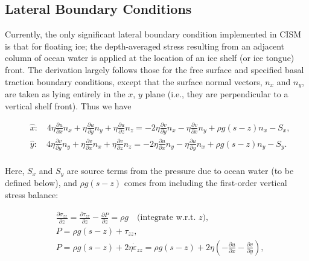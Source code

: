 
\subsection{Lateral Boundary Conditions}
Currently, the only significant lateral boundary condition implemented in CISM 
is that for floating ice; the depth-averaged stress resulting from an adjacent column of ocean water is applied at the location of an ice shelf (or ice tongue) front. The derivation largely follows those for the free surface and specified basal traction boundary conditions, except that the surface normal vectors, $n_{x}$ and $n_{y}$, are taken as lying entirely in the $x$, $y$ plane (i.e., they are perpendicular to a vertical shelf front). Thus we have

\begin{equation}
\begin{split}
  & \hat{x}:\quad 4\eta \frac{\partial u}{\partial x}n_{x}+\eta \frac{\partial u}{\partial y}n_{y}+\eta \frac{\partial u}{\partial z}n_{z}=-2\eta \frac{\partial v}{\partial y}n_{x}-\eta \frac{\partial v}{\partial x}n_{y}+\rho g\left( s-z \right)n_{x}-S_{x}, \\ 
 & \hat{y}:\quad 4\eta \frac{\partial v}{\partial y}n_{y}+\eta \frac{\partial v}{\partial x}n_{x}+\eta \frac{\partial v}{\partial z}n_{z}=-2\eta \frac{\partial u}{\partial x}n_{y}-\eta \frac{\partial u}{\partial y}n_{x}+\rho g\left( s-z \right)n_{y}-S_{y}. \\ 
\end{split}
\end{equation}

\noindent
Here, $S_x$ and $S_y$ are source terms from the pressure due to ocean water (to be defined below), and $\rho g\left( s-z \right)$ comes from including the first-order vertical stress balance:

\begin{equation}
\begin{split}
  & \frac{\partial \sigma _{zz}}{\partial z}=\frac{\partial \tau _{zz}}{\partial z}-\frac{\partial P}{\partial z}=\rho g\quad \text{(integrate w}\text{.r}\text{.t}\text{. $z$)}, \\ 
 & P=\rho g\left( s-z \right)+\tau _{zz}, \\ 
 & P=\rho g\left( s-z \right)+2\eta \dot{\varepsilon }_{zz}=\rho g\left( s-z \right)+2\eta \left( -\frac{\partial u}{\partial x}-\frac{\partial v}{\partial y} \right), \\ 
\end{split}
\end{equation}

